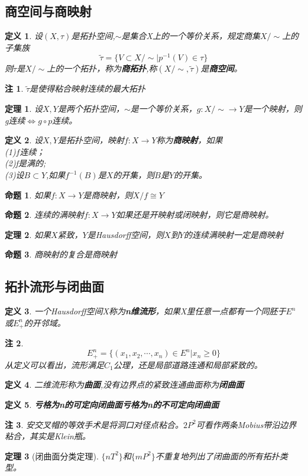\documentclass[UTF8]{ctexart}
\newtheorem{dfnt}{定义}
\newtheorem{thr}{定理}
\newtheorem*{note}{注}
\newtheorem{pro}{命题}
\begin{document}
\subsection{商空间与商映射}
\begin{dfnt}
设$(X,\tau)$是拓扑空间,$\sim$是集合X上的一个等价关系，规定商集$X/\sim$上的子集族$$\widetilde{\tau} = \{V \subset X/\sim |p^{-1}(V)\in \tau\}$$则$\widetilde{\tau}$是$X/\sim$上的一个拓扑，称为\textbf{商拓扑},称$(X/\sim,\widetilde{\tau})$是\textbf{商空间}。
\end{dfnt}
\begin{note}
$\widetilde{\tau}$是使得粘合映射连续的最大拓扑
\end{note}
\begin{thr}
设$X,Y$是两个拓扑空间，$\sim$是一个等价关系，$g:X/\sim \rightarrow Y$是一个映射，则g连续$\Leftrightarrow g\circ p$连续。 
\end{thr}
\begin{dfnt}
设$X,Y$是拓扑空间，映射$f:X\rightarrow Y$称为\textbf{商映射}，如果\\(1)$f$连续；\\(2)f是满的;\\(3)设$B\subset Y$,如果$f^{-1}(B)$是$X$的开集，则$B$是$Y$的开集。
\end{dfnt}
\begin{pro}
如果$f:X\rightarrow Y$是商映射，则$X/f \cong Y$
\end{pro}
\begin{pro}
连续的满映射$f:X\rightarrow Y$如果还是开映射或闭映射，则它是商映射。
\end{pro}
\begin{thr}
如果$X$紧致，$Y$是Hausdorff空间，则$X$到$Y$的连续满映射一定是商映射
\end{thr}
\begin{pro}
商映射的复合是商映射
\end{pro}
\subsection{拓扑流形与闭曲面}
\begin{dfnt}
一个Hausdorff空间X称为\textbf{n维流形}，如果X里任意一点都有一个同胚于$E^n$或$E^n_+$的开邻域。
\end{dfnt}
\begin{note}
$$E^n_+ = \{(x_1,x_2,\cdots,x_n)\in E^n | x_n \geq 0\}$$从定义可以看出，流形满足$C_1$公理，还是局部道路连通和局部紧致的。
\end{note}
\begin{dfnt}
二维流形称为\textbf{曲面},没有边界点的紧致连通曲面称为\textbf{闭曲面}
\end{dfnt}
\begin{dfnt}
\textbf{亏格为n的可定向闭曲面}\textbf{亏格为n的不可定向闭曲面}
\end{dfnt}
\begin{note}
安交叉帽的等效手术是将洞口对径点粘合。$2P^2$可看作两条Mobius带沿边界粘合，其实是Klein瓶。
\end{note}
\begin{thr}[闭曲面分类定理]
$\{nT^2\}$和$\{mP^2\}$不重复地列出了闭曲面的所有拓扑类型。
\end{thr}
\end{document}
